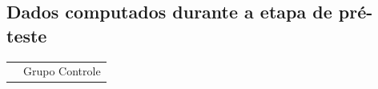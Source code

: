 \begin{apendicesenv}
\hspace{-1.6cm}


\chapter{Dados computados durante a etapa de pré-teste}\label{chap:resul1}

\begin{center}
	\hspace*{-1.4cm}
	\begin{tabular}{ l r r r r r r r r r r r r r r r r r r r}
	\hline
	& \multicolumn{19}{c}{Grupo Controle}\\
	\cline{2 - 19} %
	

\end{tabular}
\end{center}
\end{apendicesenv}
